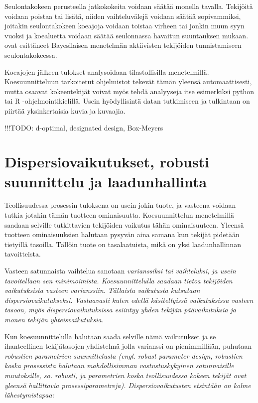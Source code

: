 \documentclass[12pt,a4paper,finnish]{tutthesis}
\newcommand\todo[1]{{\color{red}!!!TODO: #1}} %
\begin{document}
Seulontakokeen perusteella jatkokokeita voidaan säätää monella tavalla.
Tekijöitä voidaan poistaa tai lisätä, niiden vaihteluvälejä voidaan
säätää sopivammiksi, joitakin seulontakokeen koeajoja voidaan toistaa
virheen tai jonkin muun syyn vuoksi ja koealuetta voidaan säätää
seulonnassa havaitun suuntauksen mukaan.
\textcite{box1993} ovat esittäneet Bayesilaisen menetelmän
aktiivisten tekijöiden tunnistamiseen seulontakokeessa.



Koeajojen jälkeen tulokset analysoidaan tilastollisilla menetelmillä.
Koesuunnitteluun tarkoitetut ohjelmistot tekevät tämän yleensä
automaattisesti, mutta osaavat kokeentekijät voivat myös tehdä
analyyseja itse esimerkiksi python tai R -ohjelmointikielillä.
Usein hyödyllisintä datan tutkimiseen ja tulkintaan on
piirtää yksinkertaisia kuvia ja kuvaajia.





\todo{d-optimal, designated design, Box-Meyers}


\section{Dispersiovaikutukset, robusti suunnittelu ja laadunhallinta}

Teollisuudessa prosessin tuloksena on usein jokin tuote, ja vasteena voidaan
tutkia jotakin tämän tuotteen ominaisuutta. Koesuunnittelun menetelmillä
saadaan selville tutkittavien tekijöiden vaikutus tähän ominaisuuteen.
Yleensä tuotteen ominaisuuksien halutaan pysyvän aina samana kun
tekijät pidetään tietyillä tasoilla. Tällöin tuote on tasalaatuista, mikä
on yksi laadunhallinnan tavoitteista.

Vasteen satunnaista vaihtelua sanotaan \em varianssiksi \em tai \em vaihteluksi, \em
ja usein tavoitellaan sen minimoimista. Koesuunnittelulla saadaan
tietoa tekijöiden vaikutuksista vasteen varianssiin. Tällaista vaikutusta
kutsutaan \em dispersiovaikutukseksi. \em
Vastaavasti kuten edellä käsitellyissä vaikutuksissa vasteen tasoon,
myös dispersiovaikutuksissa esiintyy yhden tekijän päävaikutuksia
ja monen tekijän yhteisvaikutuksia.


Kun koesuunnittelulla halutaan saada selville nämä vaikutukset
ja se ihanteellinen tekijätasojen yhdistelmä jolla varianssi on pienimmillään,
puhutaan \em robustien parametrien suunnittelusta \em (engl. robust
parameter design, robustien koska prosessista halutaan mahdollisimman
vastustuskykyinen satunnaisille muutoksille, so. robusti, ja parametrien koska
teollisuudessa kokeen tekijät ovat yleensä hallittavia prosessiparametreja).
Dispersiovaikutusten etsintään on kolme lähestymistapaa:
\end{document}
